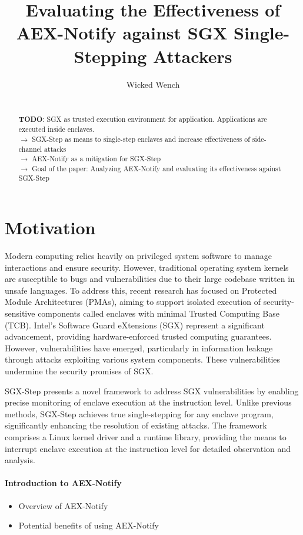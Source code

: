 \documentclass{llncs}
\title{Evaluating the Effectiveness of AEX-Notify against SGX Single-Stepping Attackers}
\author{Wicked Wench}
\institute{	University of L\"ubeck, Germany}
\begin{document}
\maketitle

\begin{abstract}
  ~ \\
  \textbf{TODO}: SGX as trusted execution environment for application. Applications are executed inside enclaves. \\
  $\to$ SGX-Step as means to single-step enclaves and increase effectiveness of side-channel attacks \\
  $\to$ AEX-Notify as a mitigation for SGX-Step \\
  $\to$ Goal of the paper: Analyzing AEX-Notify and evaluating its effectiveness against SGX-Step
\end{abstract}


\section{Motivation}

Modern computing relies heavily on privileged system software to manage interactions and ensure security.
However, traditional operating system kernels are susceptible to bugs and vulnerabilities
due to their large codebase written in unsafe languages.
To address this, recent research has focused on Protected Module Architectures (PMAs),
aiming to support isolated execution of security-sensitive components
called enclaves with minimal Trusted Computing Base (TCB).
Intel’s Software Guard eXtensions (SGX) \cite{Intel16,Intel17} represent a significant advancement,
providing hardware-enforced trusted computing guarantees.
However, vulnerabilities have emerged, particularly in information leakage
through attacks exploiting various system components.
These vulnerabilities undermine the security promises of SGX.

SGX-Step presents a novel framework to address SGX vulnerabilities by enabling
precise monitoring of enclave execution at the instruction level.
Unlike previous methods, SGX-Step achieves true single-stepping for any enclave program,
significantly enhancing the resolution of existing attacks.
The framework comprises a Linux kernel driver and a runtime library,
providing the means to interrupt enclave execution at the instruction level
for detailed observation and analysis.

\paragraph{Introduction to AEX-Notify}
\begin{itemize}
  \item Overview of AEX-Notify
  \item Potential benefits of using AEX-Notify
\end{itemize}
\end{document}
